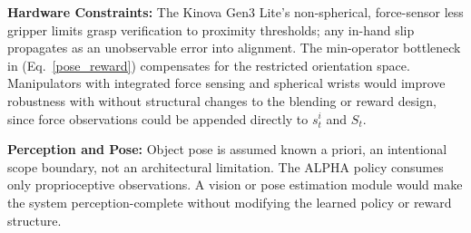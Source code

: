 \documentclass[lettersize,journal]{IEEEtran}
\begin{document}
\noindent\textbf{Hardware Constraints:} The Kinova Gen3 Lite's non-spherical, force-sensor less gripper limits grasp verification to proximity thresholds; any in-hand slip propagates as an unobservable error into alignment. The min-operator bottleneck in (Eq.~\ref{pose_reward}) compensates for the restricted orientation space. Manipulators with integrated force sensing and spherical wrists would improve robustness with without structural changes to the blending or reward design, since force observations could be appended directly to $s^i_{t}$ and $S_t$.


\noindent \textbf{Perception and Pose:} Object pose is assumed known a priori, an intentional scope boundary, not an architectural limitation. The ALPHA policy consumes only proprioceptive observations. A vision or pose estimation module would make the system perception-complete without modifying the learned policy or reward structure.
\end{document}
